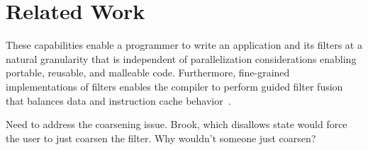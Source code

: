 \section{Related Work}


These capabilities enable a programmer to write an application and its
filters at a natural granularity that is independent of
parallelization considerations enabling portable, reusable, and
malleable code.  Furthermore, fine-grained implementations of filters
enables the compiler to perform guided filter fusion that balances
data and instruction cache behavior~\cite{sermulins-lctes05}.


Need to address the coarsening issue.  Brook, which disallows state
would force the user to just coarsen the filter.  Why wouldn't someone
just coarsen?  
